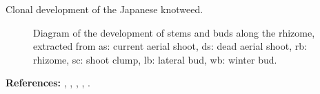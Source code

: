 \documentclass{myBeamer}
\begin{document}
\begin{frame}{Clonal development of the Japanese knotweed.}

\begin{figure}[H] 
\caption{Diagram of the development of stems and buds along the rhizome, extracted from\cite{adachi1996central} 
as: current aerial shoot, ds: dead aerial shoot, rb: rhizome, sc: shoot clump, lb: lateral bud, wb: winter bud.}
\label{network_renouee_3}
\end{figure}

\textbf{References:} \cite{adachi1996central}, \cite{dauer2013elucidating}, \cite{price2002seasonal}, \cite{beerling1994fallopia}, \cite{de2001viability}.

\end{frame}







\end{document}
